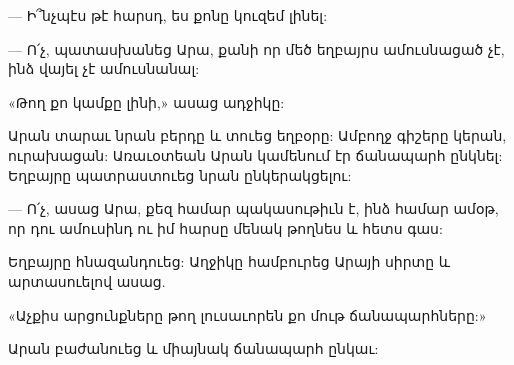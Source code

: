 \documentclass{article}
\begin{document}
{— Ի՞նչպէս թէ հարսդ, ես քոնը կուզեմ լինել:

— Ո՛չ, պատասխանեց Արա, քանի որ մեծ եղբայրս ամուսնացած չէ, ինձ վայել չէ ամուսնանալ:

«Թող քո կամքը լինի,» ասաց ադջիկը:

Արան տարաւ նրան բերդը և տուեց եղբօրը: Ամբողջ գիշերը կերան, ուրախացան: Առաւօտեան Արան կամենում էր ճանապարհ ընկնել: Եղբայրը պատրաստուեց նրան ընկերակցելու:

— Ո՛չ, ասաց Արա, քեզ համար պակասութիւն է, ինձ համար ամօթ, որ դու ամուսինդ ու իմ հարսը մենակ թողնես և հետս գաս:

Եղբայրը հնազանդուեց: Աղջիկը համբուրեց Արայի սիրտը և արտասուելով ասաց.

«Աչքիս արցունքները թող լուսաւորեն քո մութ ճանապարհները:»

Արան բաժանուեց և միայնակ ճանապարհ ընկաւ:}
\clearpage
\section{}
\end{document}
